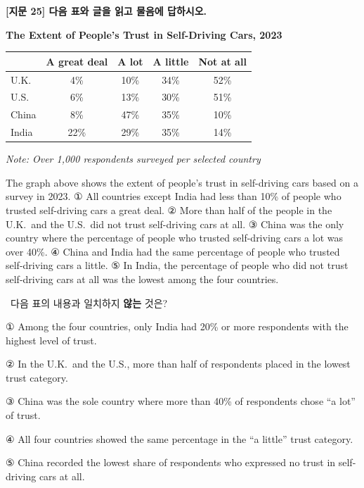 \documentclass[11pt,a4paper]{article}
\newcommand{\qno}[1]{\par\vspace{8pt}\noindent{\sffamily\bfseries #1.}\ }
\newcommand{\instr}[1]{{\sffamily #1}\par\vspace{3pt}}
\begin{document}
\begin{center}
{\fontsize{15}{17}\selectfont\sffamily\bfseries [지문 25] 다음 표와 글을 읽고 물음에 답하시오.}
\end{center}
\vspace{4pt}

\begin{center}
{\bfseries The Extent of People's Trust in Self-Driving Cars, 2023}
\end{center}
\vspace{2pt}

\begin{center}
\small
\begin{tabular}{|l|c|c|c|c|}
\hline
 & \textbf{A great deal} & \textbf{A lot} & \textbf{A little} & \textbf{Not at all} \\\hline
U.K.   & 4\%  & 10\% & 34\% & 52\% \\\hline
U.S.   & 6\%  & 13\% & 30\% & 51\% \\\hline
China  & 8\%  & 47\% & 35\% & 10\% \\\hline
India  & 22\% & 29\% & 35\% & 14\% \\\hline
\end{tabular}
\end{center}
\par\noindent\small\textit{Note: Over 1,000 respondents surveyed per selected country}

\vspace{6pt}

\noindent The graph above shows the extent of people's trust in self-driving cars based on a survey in 2023. ① All countries except India had less than 10\% of people who trusted self-driving cars a great deal. ② More than half of the people in the U.K.\ and the U.S.\ did not trust self-driving cars at all. ③ China was the only country where the percentage of people who trusted self-driving cars a lot was over 40\%. ④ China and India had the same percentage of people who trusted self-driving cars a little. ⑤ In India, the percentage of people who did not trust self-driving cars at all was the lowest among the four countries.

\vspace{10pt}

\qno{1}\instr{다음 표의 내용과 일치하지 \textbf{않는} 것은?}
\begin{choices}
\item ① Among the four countries, only India had 20\% or more respondents with the highest level of trust.
\item ② In the U.K.\ and the U.S., more than half of respondents placed in the lowest trust category.
\item ③ China was the sole country where more than 40\% of respondents chose ``a lot'' of trust.
\item ④ All four countries showed the same percentage in the ``a little'' trust category.
\item ⑤ China recorded the lowest share of respondents who expressed no trust in self-driving cars at all.
\end{choices}
\end{document}
